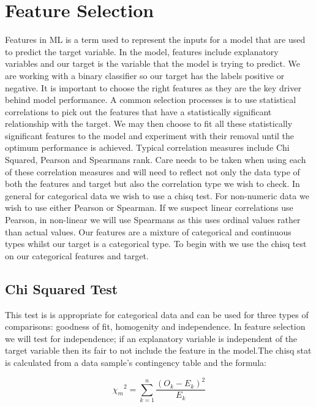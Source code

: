 \documentclass[11pt, oneside]{article}   	%
\begin{document}
\section{Feature Selection}
Features in ML is a term used to represent the inputs for a model that are used to predict the target variable. In the model, features include explanatory variables and our target is the variable that the model is trying to predict. We are working with a binary classifier so our target has the labels positive or negative. It is important to choose the right features as they are the key driver behind model performance. A common selection processes is to use statistical correlations to pick out the features that have a statistically significant relationship with the target. We may then choose to fit all these statistically significant features to the model and experiment with their removal until the optimum performance is achieved. Typical correlation measures include Chi Squared, Pearson and Spearmans rank. Care needs to be taken when using each of these correlation measures and will need to reflect not only the data type of both the features and target but also the correlation type we wish to check. In general for categorical data we wish to use a chisq test. For non-numeric data we wish to use either Pearson or Spearman. If we suspect linear correlations use Pearson, in non-linear we will use Spearmans as this uses ordinal values rather than actual values. Our features are a mixture of categorical and continuous types whilst our target is a categorical type. To begin with we use the chisq test on our categorical features and target. 

\subsection{Chi Squared Test}

This test is is appropriate for categorical data and can be used for three types of comparisons: goodness of fit, homogenity and independence. In feature selection we will test for independence; if an explanatory variable is independent of the target variable then its fair to not include the feature in the model.The chisq stat is calculated from a data sample's contingency table and the formula:

\begin{equation}\label{chi}
{\chi_m}^2=\sum_{k=1}^{n} \frac{(O_k - E_k)^2}{E_k}
\end{equation}
\end{document}
